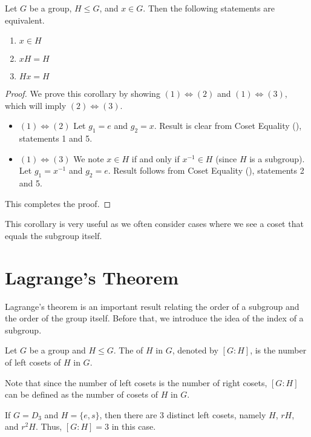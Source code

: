 \begin{corollary}\label{corollary-equivalence-of-element-in-coset}
    Let $G$ be a group, $H \leq G$, and $x \in G$. Then the following statements are equivalent.
    \begin{enumerate}
        \item $x \in H$
        \item $xH = H$
        \item $Hx = H$
    \end{enumerate}
\end{corollary}
\begin{proof}
    We prove this corollary by showing $(1) \iff (2)$ and $(1) \iff (3)$, which will imply $(2) \iff (3)$.
    \begin{itemize}
        \item $\boxed{(1) \iff (2)}$ Let $g_1 = e$ and $g_2 = x$. Result is clear from Coset Equality (), statements 1 and 5.
        \item $\boxed{(1) \iff (3)}$ We note $x \in H$ if and only if $x^{-1} \in H$ (since $H$ is a subgroup). Let $g_1 = x^{-1}$ and $g_2 = e$. Result follows from Coset Equality (), statements 2 and 5.
    \end{itemize}
    This completes the proof.
\end{proof}
\begin{remark}
    This corollary is very useful as we often consider cases where we see a coset that equals the subgroup itself.
\end{remark}

\section{Lagrange's Theorem}
Lagrange's theorem is an important result relating the order of a subgroup and the order of the group itself. Before that, we introduce the idea of the index of a subgroup.

\begin{definition}
    Let $G$ be a group and $H \leq G$. The  of $H$ in $G$, denoted by $[G : H]$, is the number of left cosets of $H$ in $G$.
\end{definition}
Note that since the number of left cosets is the number of right cosets, $[G : H]$ can be defined as the number of cosets of $H$ in $G$.

\begin{example}
    If $G = D_3$ and $H = \{e, s\}$, then there are 3 distinct left cosets, namely $H$, $rH$, and $r^2H$. Thus, $[G:H] = 3$ in this case.
\end{example}

